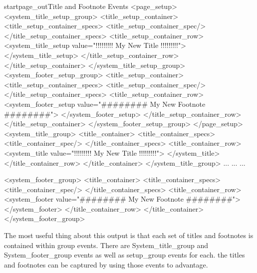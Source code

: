 \clearpage
\begin{fvoutput}{startpage_out}{Title and Footnote Events}
      <page_setup>
        <system_title_setup_group>
          <title_setup_container>
            <title_setup_container_specs>
              <title_setup_container_spec/>
            </title_setup_container_specs>
            <title_setup_container_row>
              <system_title_setup value="!!!!!!!!! My New Title !!!!!!!!!">
              </system_title_setup>
            </title_setup_container_row>
          </title_setup_container>
        </system_title_setup_group>
        <system_footer_setup_group>
          <title_setup_container>
            <title_setup_container_specs>
              <title_setup_container_spec/>
            </title_setup_container_specs>
            <title_setup_container_row>
              <system_footer_setup value="######## My New Footnote ########">
              </system_footer_setup>
            </title_setup_container_row>
          </title_setup_container>
        </system_footer_setup_group>
      </page_setup>
      <system_title_group>
        <title_container>
          <title_container_specs>
            <title_container_spec/>
          </title_container_specs>
          <title_container_row>
            <system_title value="!!!!!!!!! My New Title !!!!!!!!!">
            </system_title>
          </title_container_row>
        </title_container>
      </system_title_group>
...
...
...

      <system_footer_group>
        <title_container>
          <title_container_specs>
            <title_container_spec/>
          </title_container_specs>
          <title_container_row>
            <system_footer value="######## My New Footnote ########">
            </system_footer>
          </title_container_row>
        </title_container>
      </system_footer_group>

\end{fvoutput}

The most useful thing about this output is that each set of titles
and footnotes is contained within group events.  There are System\_title\_group
and System\_footer\_group events as well as setup\_group events for each.  the
titles and footnotes can be captured by using those events to advantage.

